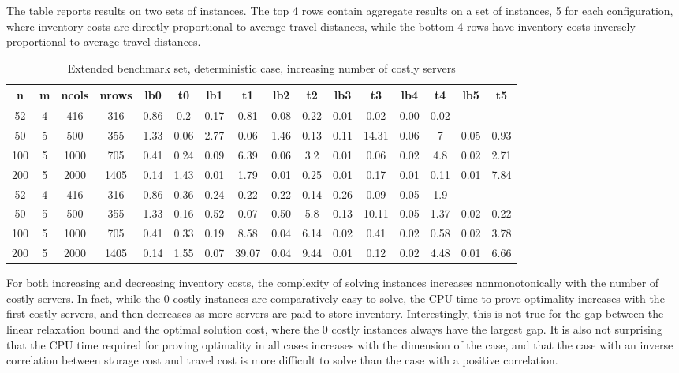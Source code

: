 \documentclass[ijoc,sglanonrev]{informs4}
\begin{document}
The table reports results on two sets of instances. The top 4 rows contain aggregate results on a set of instances, 5 for each configuration, where inventory costs are directly proportional to average travel distances, while the bottom 4 rows have inventory costs inversely proportional to average travel distances.

\begin{table}
\addtolength{\tabcolsep}{-3pt}
\footnotesize 
\centering
\renewcommand{\arraystretch}{1.2}
\begin{tabular}{cccc|cc|cc|cc|cc|cc|cc}
n & m & ncols & nrows & lb0 & t0 & lb1 & t1 & lb2 & t2 & lb3 & t3 & lb4 & t4 & lb5 & t5 \\
\hline
52 & 4  & 416 & 316 & 0.86 & 0.2 & 0.17 & 0.81 & 0.08 & 0.22 & 0.01 & 0.02 & 0.00 & 0.02 & - & - \\
50 & 5  & 500 & 355 & 1.33 & 0.06 & 2.77 & 0.06 & 1.46 & 0.13 & 0.11 & 14.31 & 0.06 & 7 & 0.05 & 0.93 \\
100 & 5 & 1000 & 705 & 0.41 & 0.24 & 0.09 & 6.39 & 0.06 & 3.2 & 0.01 & 0.06 & 0.02 & 4.8 & 0.02 & 2.71 \\
200 & 5 & 2000 & 1405 & 0.14 & 1.43 & 0.01 & 1.79 & 0.01 & 0.25 & 0.01 & 0.17 & 0.01 & 0.11 & 0.01 & 7.84 \\
\hline
52 & 4  & 416 & 316 & 0.86 & 0.36 & 0.24 & 0.22 & 0.22 & 0.14 & 0.26 & 0.09 & 0.05 & 1.9 & - & - \\
50 & 5  & 500 & 355 & 1.33 & 0.16 & 0.52 & 0.07 & 0.50 & 5.8 & 0.13 & 10.11 & 0.05 & 1.37 & 0.02 & 0.22 \\
100 & 5 & 1000 & 705 & 0.41 & 0.33 & 0.19 & 8.58 & 0.04 & 6.14 & 0.02 & 0.41 & 0.02 & 0.58 & 0.02 & 3.78 \\
200 & 5 & 2000 & 1405 & 0.14 & 1.55 & 0.07 & 39.07 & 0.04 & 9.44 & 0.01 & 0.12 & 0.02 & 4.48 & 0.01 & 6.66 \\
\hline
\end{tabular}
\caption{Extended benchmark set, deterministic case, increasing number of costly servers}
\label{table:extsetq}
\end{table}

For both increasing and decreasing inventory costs, the complexity of solving instances increases nonmonotonically with the number of costly servers. In fact, while the 0 costly instances are comparatively easy to solve, the CPU time to prove optimality increases with the first costly servers, and then decreases as more servers are paid to store inventory. Interestingly, this is not true for the gap between the linear relaxation bound and the optimal solution cost, where the 0 costly instances always have the largest gap.
It is also not surprising that the CPU time required for proving optimality in all cases increases with the dimension of the case, and that the case with an inverse correlation between storage cost and travel cost is more difficult to solve than the case with a positive correlation.
\end{document}
